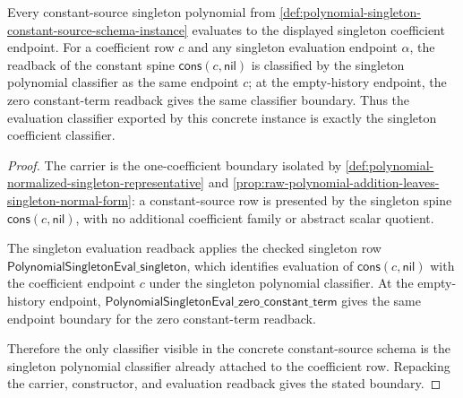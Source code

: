 \begin{theorem}
\label{thm:polynomial-singleton-constant-evaluation-boundary}
Every constant-source singleton polynomial from \autoref{def:polynomial-singleton-constant-source-schema-instance} evaluates to the displayed singleton coefficient endpoint. For a coefficient row $c$ and any singleton evaluation endpoint $\alpha$, the readback of the constant spine $\mathsf{cons}(c,\mathsf{nil})$ is classified by the singleton polynomial classifier as the same endpoint $c$; at the empty-history endpoint, the zero constant-term readback gives the same classifier boundary. Thus the evaluation classifier exported by this concrete instance is exactly the singleton coefficient classifier.
\end{theorem}
\begin{proof}
The carrier is the one-coefficient boundary isolated by \autoref{def:polynomial-normalized-singleton-representative} and \autoref{prop:raw-polynomial-addition-leaves-singleton-normal-form}: a constant-source row is presented by the singleton spine $\mathsf{cons}(c,\mathsf{nil})$, with no additional coefficient family or abstract scalar quotient.

The singleton evaluation readback applies the checked singleton row $\mathsf{PolynomialSingletonEval\_singleton}$, which identifies evaluation of $\mathsf{cons}(c,\mathsf{nil})$ with the coefficient endpoint $c$ under the singleton polynomial classifier. At the empty-history endpoint, $\mathsf{PolynomialSingletonEval\_zero\_constant\_term}$ gives the same endpoint boundary for the zero constant-term readback.

Therefore the only classifier visible in the concrete constant-source schema is the singleton polynomial classifier already attached to the coefficient row. Repacking the carrier, constructor, and evaluation readback gives the stated boundary.
\end{proof}

